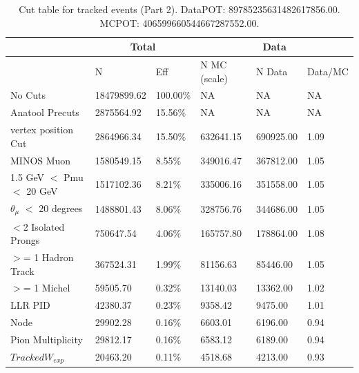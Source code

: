 \begin{table}[!hbt]
    \tiny
    \centering
    \begin{tabular}{|*{6}{l|}}


    \hline
    & \multicolumn{2}{c|}{Total} & \multicolumn{3}{c|}{Data} \\
    \hline
&  N         & Eff     & N MC (scale) & N Data    & Data/MC \\\hline

 No Cuts  & 18479899.62 & 100.00\% & NA & NA & NA \\ \hline
 Anatool Precuts  & 2875564.92 &  15.56\% & NA & NA & NA \\ \hline
 vertex position Cut & 2864966.34     &  15.50\% & 632641.15     & 690925.00 &   1.09 \\ \hline
 MINOS Muon    & 1580549.15     &   8.55\% & 349016.47     & 367812.00 &   1.05 \\ \hline
 1.5 GeV $<$ Pmu $<$ 20 GeV    & 1517102.36     &   8.21\% & 335006.16     & 351558.00 &   1.05 \\ \hline
 $\theta_{\mu}$ $<$ 20 degrees   & 1488801.43     &   8.06\% & 328756.76     & 344686.00 &   1.05 \\ \hline
 $<$2 Isolated Prongs    & 750647.54     &   4.06\% & 165757.80     & 178864.00 &   1.08 \\ \hline
 $>$= 1 Hadron Track  & 367524.31     &   1.99\%  & 81156.63     & 85446.00 &   1.05 \\ \hline
 $>$= 1 Michel    & 59505.70     &   0.32\% & 13140.03     & 13362.00 &   1.02 \\ \hline
 LLR PID    & 42380.37     &   0.23\% & 9358.42     & 9475.00 &   1.01 \\ \hline
 Node   & 29902.28     &   0.16\% & 6603.01     & 6196.00 &   0.94 \\ \hline
 Pion Multiplicity   & 29812.17     &   0.16\% & 6583.12     & 6189.00 &   0.94 \\ \hline
 $Tracked W_{exp}$  & 20463.20     &   0.11\% & 4518.68     & 4213.00 &   0.93 \\ \hline
    \end{tabular}
    \caption{Cut table for tracked events (Part 2). DataPOT: 89785235631482617856.00. MCPOT: 406599660544667287552.00.}
    \label{tab:Analysis:Cuts:TrackedCutTable2}
\end{table}


\pagebreak

